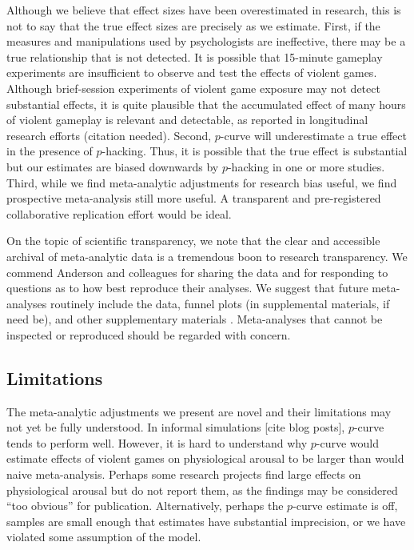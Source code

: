 \documentclass[man]{apa6}
\begin{document}
Although we believe that effect sizes have been overestimated in research, this is not to say that the true effect sizes are precisely as we estimate. First, if the measures and manipulations used by psychologists are ineffective, there may be a true relationship that is not detected. It is possible that 15-minute gameplay experiments are insufficient to observe and test the effects of violent games. Although brief-session experiments of violent game exposure may not detect substantial effects, it is quite plausible that the accumulated effect of many hours of violent gameplay is relevant and detectable, as reported in longitudinal research efforts (citation needed). Second, $p$-curve will underestimate a true effect in the presence of $p$-hacking. Thus, it is possible that the true effect is substantial but our estimates are biased downwards by $p$-hacking in one or more studies. Third, while we find meta-analytic adjustments for research bias useful, we find prospective meta-analysis still more useful. A transparent and pre-registered collaborative replication effort would be ideal.

On the topic of scientific transparency, we note that the clear and accessible archival of meta-analytic data is a tremendous boon to research transparency. We commend Anderson and colleagues for sharing the data and for responding to questions as to how best reproduce their analyses. We suggest that future meta-analyses routinely include the data, funnel plots (in supplemental materials, if need be), and other supplementary materials \citep{Lakens:etal:2015}. Meta-analyses that cannot be inspected or reproduced should be regarded with concern.

\subsection{Limitations}
The meta-analytic adjustments we present are novel and their limitations may not yet be fully understood. In informal simulations [cite blog posts], $p$-curve tends to perform well. However, it is hard to understand why $p$-curve would estimate effects of violent games on physiological arousal to be larger than would naive meta-analysis. Perhaps some research projects find large effects on physiological arousal but do not report them, as the findings may be considered ``too obvious'' for publication. Alternatively, perhaps the $p$-curve estimate is off, samples are small enough that estimates have substantial imprecision, or we have violated some assumption of the model.
\end{document}
